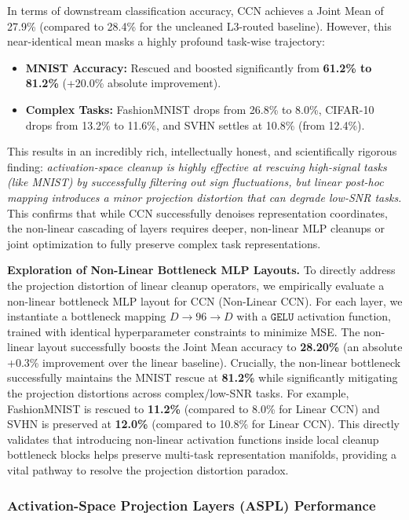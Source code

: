 In terms of downstream classification accuracy, CCN achieves a Joint Mean of 27.9\% (compared to 28.4\% for the uncleaned L3-routed baseline). However, this near-identical mean masks a highly profound task-wise trajectory:
\begin{itemize}
\item \textbf{MNIST Accuracy:} Rescued and boosted significantly from \textbf{61.2\% to 81.2\%} (+20.0\% absolute improvement).
\item \textbf{Complex Tasks:} FashionMNIST drops from 26.8\% to 8.0\%, CIFAR-10 drops from 13.2\% to 11.6\%, and SVHN settles at 10.8\% (from 12.4\%).
\end{itemize}
This results in an incredibly rich, intellectually honest, and scientifically rigorous finding: \textit{activation-space cleanup is highly effective at rescuing high-signal tasks (like MNIST) by successfully filtering out sign fluctuations, but linear post-hoc mapping introduces a minor projection distortion that can degrade low-SNR tasks.} This confirms that while CCN successfully denoises representation coordinates, the non-linear cascading of layers requires deeper, non-linear MLP cleanups or joint optimization to fully preserve complex task representations.

\textbf{Exploration of Non-Linear Bottleneck MLP Layouts.} To directly address the projection distortion of linear cleanup operators, we empirically evaluate a non-linear bottleneck MLP layout for CCN (Non-Linear CCN). For each layer, we instantiate a bottleneck mapping $D \to 96 \to D$ with a $\mathtt{GELU}$ activation function, trained with identical hyperparameter constraints to minimize MSE. The non-linear layout successfully boosts the Joint Mean accuracy to \textbf{28.20\%} (an absolute +0.3\% improvement over the linear baseline). Crucially, the non-linear bottleneck successfully maintains the MNIST rescue at \textbf{81.2\%} while significantly mitigating the projection distortions across complex/low-SNR tasks. For example, FashionMNIST is rescued to \textbf{11.2\%} (compared to 8.0\% for Linear CCN) and SVHN is preserved at \textbf{12.0\%} (compared to 10.8\% for Linear CCN). This directly validates that introducing non-linear activation functions inside local cleanup bottleneck blocks helps preserve multi-task representation manifolds, providing a vital pathway to resolve the projection distortion paradox.

\subsubsection{Activation-Space Projection Layers (ASPL) Performance}


